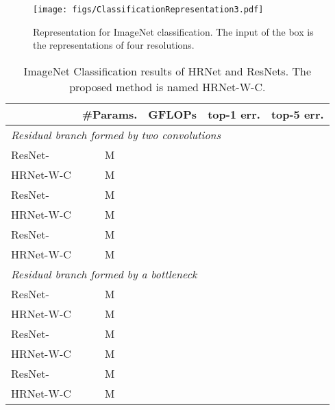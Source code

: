 \documentclass[10pt,twocolumn,letterpaper]{article}
\begin{document}
\begin{figure}
\footnotesize
    \centering
    \texttt{[image: figs/ClassificationRepresentation3.pdf]}
    \caption{Representation for ImageNet classification.
    The input of the box
    is the representations
    of four resolutions.}
    \label{fig:classificationhead}
    \vspace{-4mm}
\end{figure}

	\begin{table}[ht]
	\setlength{\tabcolsep}{9.8pt}
	\scriptsize
	\centering
	\caption{ImageNet Classification results of HRNet and ResNets. The proposed method is named HRNet-W-C.}
	\begin{tabular}{l|cc|cc}
		\hline
		& \#Params. & GFLOPs & top-1 err. & top-5 err. \\
		\hline
		
		\hline
		\multicolumn{5}{l}{\emph {Residual branch formed by two  convolutions}}\\
		\hline
		ResNet- & M &  &  &  \\
		HRNet-W-C& M &  &  &  \\
		\hline
		ResNet- & M &  &  &  \\
		HRNet-W-C& M &  &  &  \\
		\hline
		ResNet-& M &  &  &  \\	
		HRNet-W-C& M &  &  &  \\
		\hline
		
		\hline
		\multicolumn{5}{l}{\emph {Residual branch formed by a bottleneck}}\\
		\hline
		ResNet-& M &  &  &  \\
		HRNet-W-C& M &  &  &  \\
		\hline
		ResNet-& M &  &  &  \\
		HRNet-W-C& M &  &  &  \\
		\hline
		ResNet-& M &  &  &  \\
		HRNet-W-C& M &  &  &  \\
		\hline
	\end{tabular}
	\label{tab:ImageNetClassificationComparison}
	\vspace{-4mm}
	\end{table}
	
\end{document}
